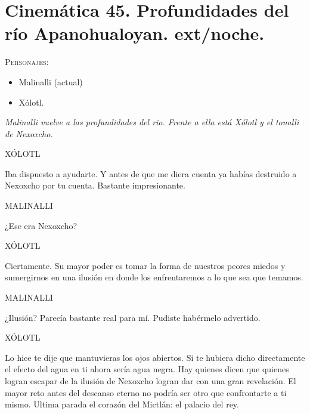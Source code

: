 \documentclass[11pt,letterpaper]{article}
\begin{document}
\section{Cinemática 45. Profundidades del río Apanohualoyan. ext/noche. }
 \textsc{Personajes}:
 \begin{itemize}
 \item Malinalli (actual)
\item Xólotl.

 \end{itemize}
\textit{Malinalli vuelve a las profundidades del rio. Frente a ella está Xólotl y el tonalli de Nexoxcho.}
\begin{center}
XÓLOTL
\\
\par
Iba dispuesto a ayudarte.  Y antes de que me diera cuenta ya habías destruido a Nexoxcho por tu cuenta. Bastante impresionante.
\\
\par
MALINALLI
\\
\par
¿Ese era Nexoxcho?
\\
\par
XÓLOTL
\\
\par
Ciertamente. Su mayor poder es tomar la forma de nuestros peores miedos y sumergirnos en una ilusión en donde los enfrentaremos a lo que sea que temamos.
\\
\par
MALINALLI
\\
\par
¿Ilusión? Parecía bastante real para mí. Pudiste habérmelo advertido.
\\
\par
XÓLOTL
\\
\par
Lo hice te dije que mantuvieras los ojos abiertos. Si te hubiera dicho directamente el efecto del agua en ti ahora sería agua negra. Hay quienes dicen que quienes logran escapar de la ilusión de Nexoxcho logran dar con una gran revelación. El mayor reto antes del descanso eterno no podría ser otro que confrontarte a ti mismo. Ultima parada el corazón del Mictlán: el palacio del rey.  
\end{center}
\end{document}
